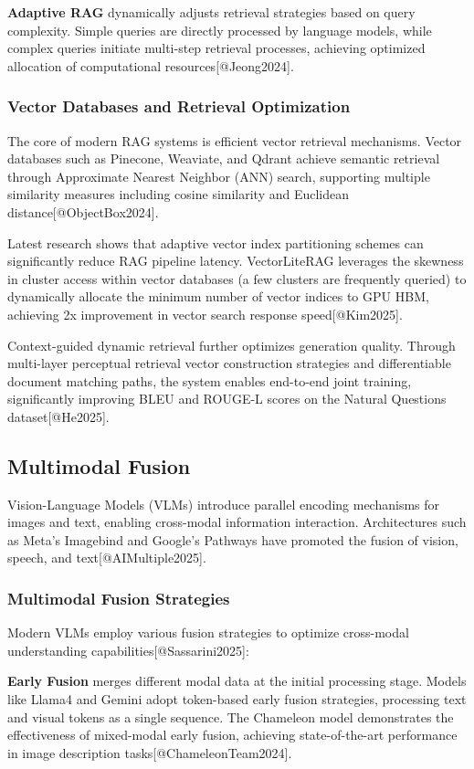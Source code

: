 \documentclass{article}
\begin{document}
\textbf{Adaptive RAG} dynamically adjusts retrieval strategies based on query complexity. Simple queries are directly processed by language models, while complex queries initiate multi-step retrieval processes, achieving optimized allocation of computational resources[@Jeong2024].

\subsubsection{Vector Databases and Retrieval Optimization}
The core of modern RAG systems is efficient vector retrieval mechanisms. Vector databases such as Pinecone, Weaviate, and Qdrant achieve semantic retrieval through Approximate Nearest Neighbor (ANN) search, supporting multiple similarity measures including cosine similarity and Euclidean distance[@ObjectBox2024].

Latest research shows that adaptive vector index partitioning schemes can significantly reduce RAG pipeline latency. VectorLiteRAG leverages the skewness in cluster access within vector databases (a few clusters are frequently queried) to dynamically allocate the minimum number of vector indices to GPU HBM, achieving 2x improvement in vector search response speed[@Kim2025].

Context-guided dynamic retrieval further optimizes generation quality. Through multi-layer perceptual retrieval vector construction strategies and differentiable document matching paths, the system enables end-to-end joint training, significantly improving BLEU and ROUGE-L scores on the Natural Questions dataset[@He2025].

\subsection{Multimodal Fusion}
Vision-Language Models (VLMs) introduce parallel encoding mechanisms for images and text, enabling cross-modal information interaction. Architectures such as Meta's Imagebind and Google's Pathways have promoted the fusion of vision, speech, and text[@AIMultiple2025].

\subsubsection{Multimodal Fusion Strategies}
Modern VLMs employ various fusion strategies to optimize cross-modal understanding capabilities[@Sassarini2025]:

\textbf{Early Fusion} merges different modal data at the initial processing stage. Models like Llama4 and Gemini adopt token-based early fusion strategies, processing text and visual tokens as a single sequence. The Chameleon model demonstrates the effectiveness of mixed-modal early fusion, achieving state-of-the-art performance in image description tasks[@ChameleonTeam2024].
\end{document}
